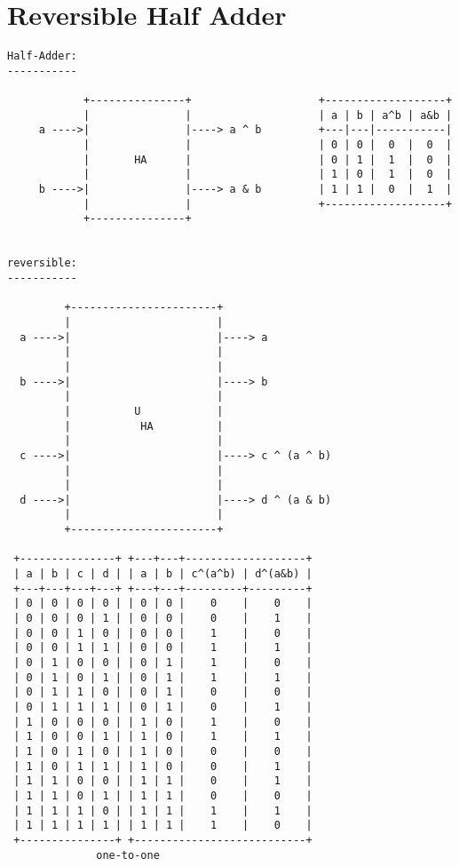 \documentclass{article}
\begin{document}
\section{Reversible Half Adder}
\begin{verbatim}
Half-Adder:
-----------

            +---------------+                    +-------------------+
            |               |                    | a | b | a^b | a&b |               
     a ---->|               |----> a ^ b         +---|---|-----------|               
            |               |                    | 0 | 0 |  0  |  0  |               
            |       HA      |                    | 0 | 1 |  1  |  0  |               
            |               |                    | 1 | 0 |  1  |  0  |               
     b ---->|               |----> a & b         | 1 | 1 |  0  |  1  |               
            |               |                    +-------------------+               
            +---------------+                                            


reversible:
-----------
                                                          
         +-----------------------+                                                  
         |                       |                                                  
  a ---->|                       |----> a                                           
         |                       |                                                  
         |                       |                                                  
  b ---->|                       |----> b                                           
         |                       |                                                  
         |          U            |                                                  
         |           HA          |
         |                       |
  c ---->|                       |----> c ^ (a ^ b)   
         |                       |
         |                       |
  d ---->|                       |----> d ^ (a & b)  
         |                       |
         +-----------------------+

 +---------------+ +---+---+-------------------+
 | a | b | c | d | | a | b | c^(a^b) | d^(a&b) |
 +---+---+---+---+ +---+---+---------+---------+
 | 0 | 0 | 0 | 0 | | 0 | 0 |    0    |    0    |
 | 0 | 0 | 0 | 1 | | 0 | 0 |    0    |    1    |
 | 0 | 0 | 1 | 0 | | 0 | 0 |    1    |    0    |
 | 0 | 0 | 1 | 1 | | 0 | 0 |    1    |    1    |
 | 0 | 1 | 0 | 0 | | 0 | 1 |    1    |    0    |
 | 0 | 1 | 0 | 1 | | 0 | 1 |    1    |    1    |
 | 0 | 1 | 1 | 0 | | 0 | 1 |    0    |    0    |
 | 0 | 1 | 1 | 1 | | 0 | 1 |    0    |    1    |
 | 1 | 0 | 0 | 0 | | 1 | 0 |    1    |    0    |
 | 1 | 0 | 0 | 1 | | 1 | 0 |    1    |    1    |
 | 1 | 0 | 1 | 0 | | 1 | 0 |    0    |    0    |
 | 1 | 0 | 1 | 1 | | 1 | 0 |    0    |    1    |
 | 1 | 1 | 0 | 0 | | 1 | 1 |    0    |    1    |
 | 1 | 1 | 0 | 1 | | 1 | 1 |    0    |    0    |
 | 1 | 1 | 1 | 0 | | 1 | 1 |    1    |    1    |
 | 1 | 1 | 1 | 1 | | 1 | 1 |    1    |    0    |
 +---------------+ +---------------------------+
              one-to-one




\end{verbatim}
\end{document}
